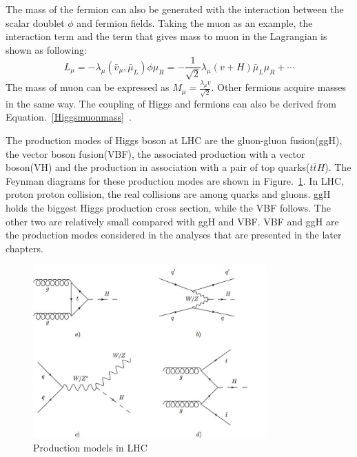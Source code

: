 The mass of the fermion can also be generated with the interaction between the scalar doublet $\phi$ and fermion fields. Taking the muon as an example, the interaction term and the term that gives mass to muon in the Lagrangian is shown as following:
\begin{equation}\label{Higgsmuonmass}
L_{\mu}=-\lambda_{\mu}(\bar{v}_{\mu},\bar{\mu}_{L})\phi\mu_{R}
            =-\frac{1}{\sqrt{2}}\lambda_{\mu}(v+H)\bar{\mu}_{L}\mu_{R}+ \cdots
\end{equation}
The mass of muon can be expressed as $M_{\mu}=\frac{\lambda_{\mu}v}{\sqrt{2}}$. Other fermions acquire masses in the same way. The coupling of Higgs and fermions can also be derived from Equation.~\ref{Higgsmuonmass}~\cite{DJOUADI20081}. 

The production modes of Higgs boson at LHC are the gluon-gluon fusion(ggH), the vector boson fusion(VBF), the associated production with a vector boson(VH) and the production in association with a pair of top quarks($t\bar{t}H$). The Feynman diagrams for these production modes are shown in Figure.~\ref{fig:SM_H_production}. In LHC, proton proton collision, the real collisions are among quarks and gluons. ggH holds the biggest Higgs production cross section, while the VBF follows. The other two are relatively small compared with ggH and VBF. VBF and ggH are the production modes considered in the analyses that are presented in the later chapters.   
\begin{figure}[htbp] 
\centering
\includegraphics[width=0.8\textwidth]{chapter2/Higgs_production.jpg}
\caption{Production models in LHC}%
\label{fig:SM_H_production}
\end{figure}









